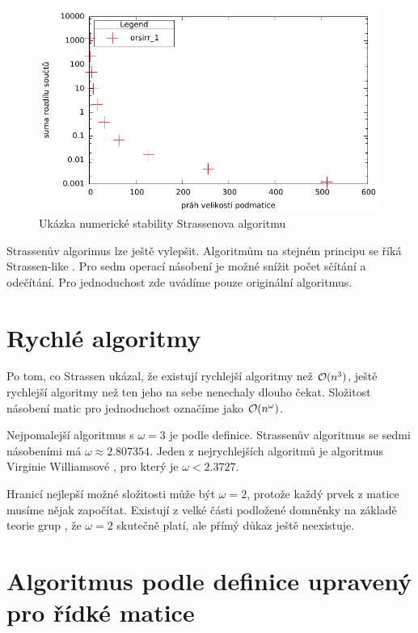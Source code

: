 \begin{figure}[H]\centering
	\includegraphics[width=\textwidth]{./images/strassen_stability}
	\caption{Ukázka numerické stability Strassenova algoritmu}
	\label{fig:StrassenStability}
\end{figure}

Strassenův algorimus lze ještě vylepšit. Algoritmům na stejném principu se říká Strassen-like \cite{DBLP:journals/iacr/CenkH13}. Pro sedm operací násobení je možné snížit počet sčítání a odečítání. Pro jednoduchost zde uvádíme pouze originální algoritmus.

\section{Rychlé algoritmy}

Po tom, co Strassen ukázal, že existují rychlejší algoritmy než $\mathcal{O}(n^3)$, ještě rychlejší algoritmy než ten jeho na sebe nenechaly dlouho čekat. Složitost násobení matic pro jednoduchost označíme jako $\mathcal{O}(n^\omega)$.

Nejpomalejší algoritmus s $\omega=3$ je podle definice. Strassenův algoritmus se sedmi násobeními má $\omega\approx2.807354$. Jeden z nejrychlejších algoritmů je algoritmus Virginie Williamsové \cite{DBLP:conf/stoc/Williams12}\cite{BreakigCWB}, pro který je $\omega<2.3727$. 

Hranicí nejlepší možné složitosti může být $\omega=2$, protože každý prvek z matice musíme nějak započítat. Existují z velké části podložené domněnky na základě teorie grup \cite{complexityMM}, že $\omega=2$ skutečně platí, ale přímý důkaz ještě neexistuje.

\section{Algoritmus podle definice upravený pro řídké matice}

